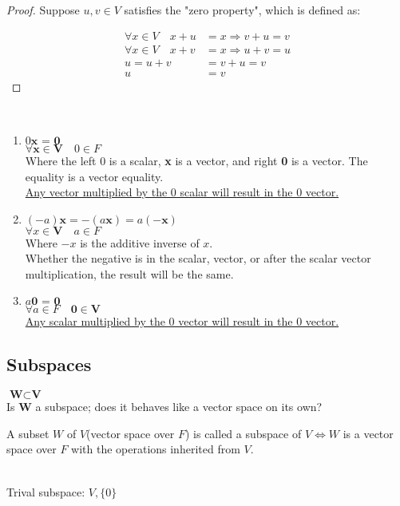 \documentclass[11pt]{scrartcl}
\makeatletter
\newenvironment{Dequation}
  {%
  \def\tagform@##1{%
    \maketag@@@{\makebox[0pt][r]{(\ignorespaces##1\unskip\@@italiccorr)}}}%
  \ignorespaces
  }
  {%
  \def\tagform@##1{\maketag@@@{(\ignorespaces##1\unskip\@@italiccorr)}}%
  \ignorespacesafterend
  }
\makeatother
\begin{document}
\begin{proof}
Suppose $u,v \in V$ satisfies the "zero property", which is defined as:

\begin{Dequation}
\begin{align*}
	\forall x \in V \quad x + u & = x \Rightarrow v + u = v \\
	\forall x \in V \quad x + v & = x \Rightarrow u + v = u \\
	u = u + v & = v + u = v \tag{Transitive property}\\
	u & = v \tag{Theorem 1.1}
\end{align*}
\end{Dequation}
\end{proof}
\begin{theorem*}
	\-\
	\begin{enumerate}[label=\alph*.]
		\item{$0 \textbf{x = 0} $\\
				$\forall \textbf{x} \in \textbf{V} \quad 0 \in F $\\ 
			Where the left 0 is a scalar, \textbf{x} is a vector, and right \textbf{0} is a vector. The equality is a vector equality. \\ \ul{Any vector multiplied by the 0 scalar will result in the 0 vector.}} \item{
				$(-a)\textbf{x} = -(a\textbf{x}) = a(-\textbf{x})$\\
				$\forall x \in \textbf{V} \quad a \in F$\\
		Where $-x$ is the additive inverse of $x$. \\ {Whether the negative is in the scalar, vector, or after the scalar vector multiplication, the result will be the same.}}	
			\item{$a\textbf{0 = 0}$ \\ $\forall a \in F \quad \textbf{0} \in \textbf{V}$ \\ \ul{Any scalar multiplied by the 0 vector will result in the 0 vector.}}
	\end{enumerate}
\end{theorem*}

\subsection{Subspaces}
$\textbf{W} \subset \textbf{V}$\\
Is $\textbf{W}$ a subspace; does it behaves like a vector space on its own?
\begin{definition*}
	[1.3 Subspaces]
	A subset $W$ of $V$(vector space over $F$) is called a subspace of $V \Leftrightarrow W$ is a vector space over $F$ with the operations inherited from $V$.   
\end{definition*}
\-\ \\
Trival subspace: \quad $V, \{0\}$
\end{document}

